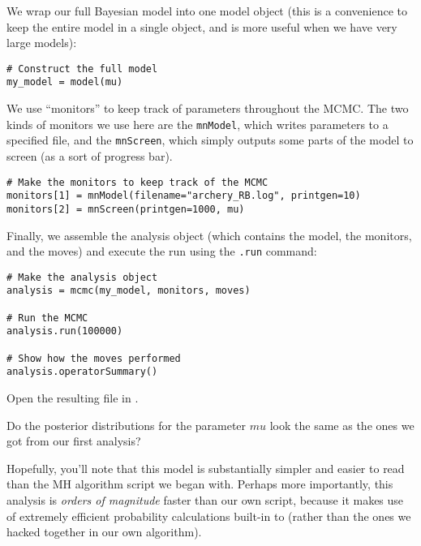 We wrap our full Bayesian model into one model object (this is a convenience to keep the entire model in a single object, and is more useful when we have very large models):
{\tt \begin{snugshade*}
\begin{lstlisting}    
# Construct the full model
my_model = model(mu)
\end{lstlisting}
\end{snugshade*}}

We use ``monitors'' to keep track of parameters throughout the MCMC.
The two kinds of monitors we use here are the \texttt{mnModel}, which writes parameters to a specified file, and the \texttt{mnScreen}, which simply outputs some parts of the model to screen (as a sort of progress bar).
{\tt \begin{snugshade*}
\begin{lstlisting}    
# Make the monitors to keep track of the MCMC
monitors[1] = mnModel(filename="archery_RB.log", printgen=10)
monitors[2] = mnScreen(printgen=1000, mu)
\end{lstlisting}
\end{snugshade*}}

Finally, we assemble the analysis object (which contains the model, the monitors, and the moves) and execute the run using the \texttt{.run} command:
{\tt \begin{snugshade*}
\begin{lstlisting}    
# Make the analysis object
analysis = mcmc(my_model, monitors, moves)

# Run the MCMC
analysis.run(100000)

# Show how the moves performed
analysis.operatorSummary()
\end{lstlisting}
\end{snugshade*}}
\begin{framed}
Open the resulting  file in \Tracer.

\QUEST Do the posterior distributions for the parameter $mu$ look the same as the ones we got from our first analysis?
\end{framed}


Hopefully, you'll note that this \Rev model is substantially simpler and easier to read than the MH algorithm script we began with.
Perhaps more importantly, this \Rev analysis is \emph{orders of magnitude} faster than our own script, because it makes use of extremely efficient probability calculations built-in to \RevBayes (rather than the ones we hacked together in our own algorithm).

